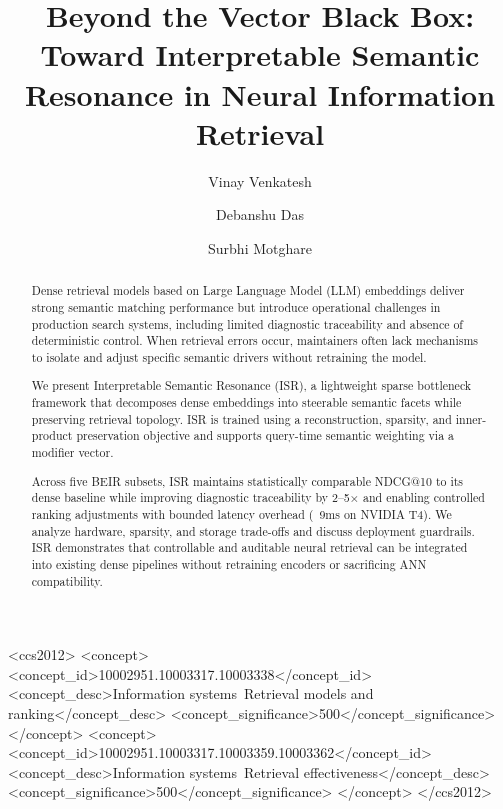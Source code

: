 \documentclass[sigconf,authordraft]{acmart}
\begin{document}
\title{Beyond the Vector Black Box: Toward Interpretable Semantic Resonance in Neural Information Retrieval}

\author{Vinay Venkatesh}

\author{Debanshu Das}

\author{Surbhi Motghare}

\renewcommand{\shortauthors}{Venkatesh, Das, and Motghare}

\begin{abstract}
Dense retrieval models based on Large Language Model (LLM) embeddings deliver strong semantic matching performance but introduce operational challenges in production search systems, including limited diagnostic traceability and absence of deterministic control. When retrieval errors occur, maintainers often lack mechanisms to isolate and adjust specific semantic drivers without retraining the model.

We present Interpretable Semantic Resonance (ISR), a lightweight sparse bottleneck framework that decomposes dense embeddings into steerable semantic facets while preserving retrieval topology. ISR is trained using a reconstruction, sparsity, and inner-product preservation objective and supports query-time semantic weighting via a modifier vector.

Across five BEIR subsets, ISR maintains statistically comparable NDCG@10 to its dense baseline while improving diagnostic traceability by 2–5× and enabling controlled ranking adjustments with bounded latency overhead (~9ms on NVIDIA T4). We analyze hardware, sparsity, and storage trade-offs and discuss deployment guardrails. ISR demonstrates that controllable and auditable neural retrieval can be integrated into existing dense pipelines without retraining encoders or sacrificing ANN compatibility.
\end{abstract}

\begin{CCSXML}
<ccs2012>
   <concept>
       <concept_id>10002951.10003317.10003338</concept_id>
       <concept_desc>Information systems~Retrieval models and ranking</concept_desc>
       <concept_significance>500</concept_significance>
   </concept>
   <concept>
       <concept_id>10002951.10003317.10003359.10003362</concept_id>
       <concept_desc>Information systems~Retrieval effectiveness</concept_desc>
       <concept_significance>500</concept_significance>
   </concept>
 </ccs2012>
\end{CCSXML}
\end{document}
